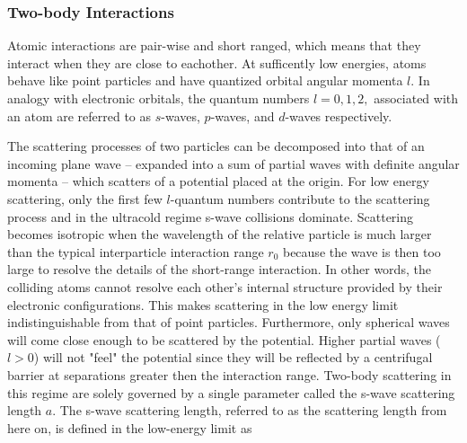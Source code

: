 \documentclass{article}
\numberwithin{equation}{section}
\numberwithin{figure}{section}
\begin{document}
\subsubsection{Two-body Interactions}
Atomic interactions are pair-wise and short ranged, which means that they interact when they are close to eachother. At sufficently low energies, atoms behave like point particles and have quantized orbital angular momenta $l$. In analogy with electronic orbitals, the quantum numbers $l=0,1,2,$ associated with an atom are referred to as $s$-waves, $p$-waves, and $d$-waves respectively. 

The scattering processes of two particles can be decomposed into that of an incoming plane wave -- expanded into a sum of partial waves with definite angular momenta -- which scatters of a potential placed at the origin. For low energy scattering, only the first few $l$-quantum numbers contribute to the scattering process and in the ultracold regime s-wave collisions dominate. Scattering becomes isotropic when the wavelength of the relative particle is much larger than the typical interparticle interaction range $r_0$ because the wave is then too large to resolve the details of the short-range interaction. In other words, the colliding atoms cannot resolve each other's internal structure provided by their electronic configurations. This makes scattering in the low energy limit indistinguishable from that of point particles. Furthermore, only spherical waves will come close enough to be scattered by the potential. Higher partial waves ($l>0$) will not "feel" the potential since they will be reflected by a centrifugal barrier at separations greater then the interaction range. Two-body scattering in this regime are solely governed by a single parameter called the s-wave scattering length $a$. The s-wave scattering length, referred to as the scattering length from here on, is defined in the low-energy limit as
\end{document}
